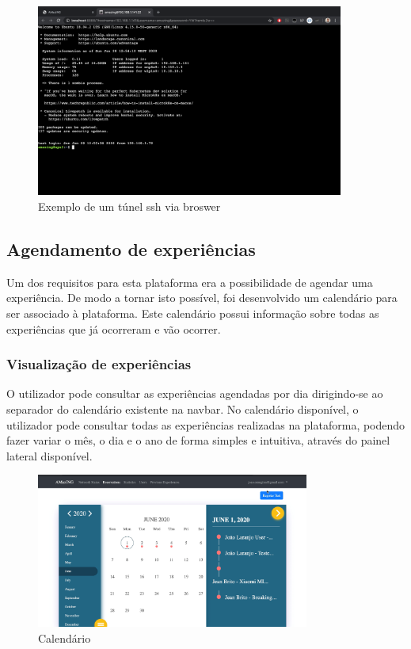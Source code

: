 \begin{figure}[!ht]
    \centering
    \includegraphics[width=0.9\textwidth]{images/webssh.png}
    \caption{Exemplo de um túnel ssh via broswer}
    \label{fig:ssh}
\end{figure}

\subsection{Agendamento de experiências}
Um dos requisitos para esta plataforma era a possibilidade de agendar uma experiência. De modo a tornar isto possível, foi desenvolvido um calendário para ser associado à plataforma. Este calendário possui informação sobre todas as experiências que já ocorreram e vão ocorrer.
\subsubsection{Visualização de experiências}
O utilizador pode consultar as experiências agendadas por dia dirigindo-se ao separador do calendário existente na navbar.\newline
No calendário disponível, o utilizador pode consultar todas as experiências realizadas na plataforma, podendo fazer variar o mês, o dia e o ano de forma simples e intuitiva, através do painel lateral disponível.
\newpage
\begin{figure}[!ht]
    \centering
    \includegraphics[width=0.8\textwidth]{images/calendar.png}
    \caption{Calendário}
    \label{fig:calendar}
\end{figure}

